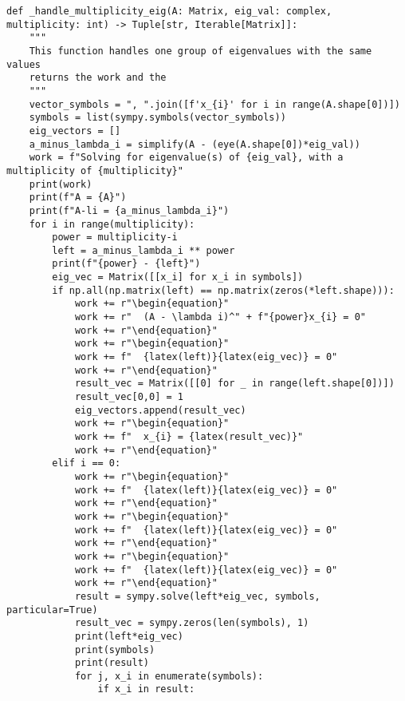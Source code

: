 \begin{verbatim}
def _handle_multiplicity_eig(A: Matrix, eig_val: complex, multiplicity: int) -> Tuple[str, Iterable[Matrix]]:
    """
    This function handles one group of eigenvalues with the same values
    returns the work and the 
    """
    vector_symbols = ", ".join([f'x_{i}' for i in range(A.shape[0])])
    symbols = list(sympy.symbols(vector_symbols))
    eig_vectors = []
    a_minus_lambda_i = simplify(A - (eye(A.shape[0])*eig_val))
    work = f"Solving for eigenvalue(s) of {eig_val}, with a multiplicity of {multiplicity}"
    print(work)
    print(f"A = {A}")
    print(f"A-li = {a_minus_lambda_i}")
    for i in range(multiplicity):
        power = multiplicity-i
        left = a_minus_lambda_i ** power
        print(f"{power} - {left}")
        eig_vec = Matrix([[x_i] for x_i in symbols])
        if np.all(np.matrix(left) == np.matrix(zeros(*left.shape))):
            work += r"\begin{equation}"
            work += r"  (A - \lambda i)^" + f"{power}x_{i} = 0"
            work += r"\end{equation}"
            work += r"\begin{equation}"
            work += f"  {latex(left)}{latex(eig_vec)} = 0"
            work += r"\end{equation}"
            result_vec = Matrix([[0] for _ in range(left.shape[0])])
            result_vec[0,0] = 1
            eig_vectors.append(result_vec)
            work += r"\begin{equation}"
            work += f"  x_{i} = {latex(result_vec)}"
            work += r"\end{equation}"
        elif i == 0:
            work += r"\begin{equation}"
            work += f"  {latex(left)}{latex(eig_vec)} = 0"
            work += r"\end{equation}"
            work += r"\begin{equation}"
            work += f"  {latex(left)}{latex(eig_vec)} = 0"
            work += r"\end{equation}"
            work += r"\begin{equation}"
            work += f"  {latex(left)}{latex(eig_vec)} = 0"
            work += r"\end{equation}"
            result = sympy.solve(left*eig_vec, symbols, particular=True)
            result_vec = sympy.zeros(len(symbols), 1)
            print(left*eig_vec)
            print(symbols)
            print(result)
            for j, x_i in enumerate(symbols):
                if x_i in result:

\end{verbatim}
